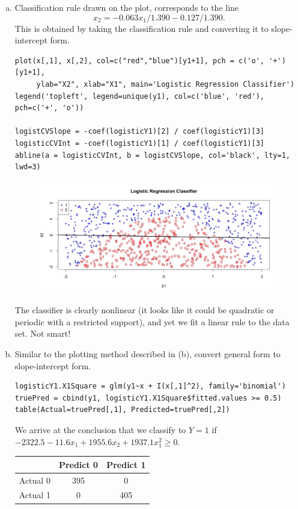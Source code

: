 \documentclass[12pt]{article}
\begin{document}
\begin{enumerate}[(a)]
\item Classification rule drawn on the plot, corresponds to the line 
$$x_2 = -0.063 x_1 / 1.390  - 0.127 / 1.390.$$ 
This is obtained by taking the classification rule and converting it to slope-intercept form.
\begin{lstlisting}
plot(x[,1], x[,2], col=c("red","blue")[y1+1], pch = c('o', '+')[y1+1], 
     ylab="X2", xlab="X1", main='Logistic Regression Classifier')
legend('topleft', legend=unique(y1), col=c('blue', 'red'), pch=c('+', 'o'))

logistCVSlope = -coef(logisticY1)[2] / coef(logisticY1)[3]
logisticCVInt = -coef(logisticY1)[1] / coef(logisticY1)[3]
abline(a = logisticCVInt, b = logistCVSlope, col='black', lty=1, lwd=3)
\end{lstlisting}
\begin{figure}[H] \center
\includegraphics[scale=.4]{y1_plot2.jpeg}
\end{figure}
The classifier is clearly nonlinear (it looks like it could be quadratic or periodic with a restricted support), and yet we fit a linear rule to the data set. Not smart!
\item Similar to the plotting method described in (b), convert general form to slope-intercept form. 
\begin{lstlisting}
logisticY1.X1Square = glm(y1~x + I(x[,1]^2), family='binomial')
truePred = cbind(y1, logisticY1.X1Square$fitted.values >= 0.5)
table(Actual=truePred[,1], Predicted=truePred[,2])
\end{lstlisting}
We arrive at the conclusion that we classify to $Y=1$ if $-2322.5 -11.6 x_1 + 1955.6 x_2 + 1937.1 x_1^2 \geq 0$.
\begin{table}[H] \center
\begin{tabular}{ccc} \hline
& Predict 0 & Predict 1 \\ \hline
Actual 0 & 395 & 0 \\ 
Actual 1 & 0 & 405 \\ \hline

\end{tabular}
\end{table}
\end{enumerate}
\end{document}
